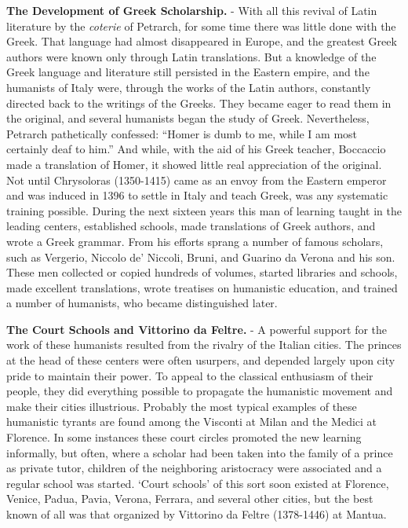 \documentclass[
]{book}
\begin{document}
\textbf{The Development of Greek Scholarship.} - With all this revival of Latin literature by the \emph{coterie} of Petrarch, for some time there was little done with the Greek. That language had almost disappeared in Europe, and the greatest Greek authors were known only through Latin translations. But a knowledge of the Greek language and literature still persisted in the Eastern empire, and the humanists of Italy were, through the works of the Latin authors, constantly directed back to the writings of the Greeks. They became eager to read them in the original, and several humanists began the study of Greek. Nevertheless, Petrarch pathetically confessed: ``Homer is dumb to me, while I am most certainly deaf to him.'' And while, with the aid of his Greek teacher, Boccaccio made a translation of Homer, it showed little real appreciation of the original. Not until Chrysoloras (1350-1415) came as an envoy from the Eastern emperor and was induced in 1396 to settle in Italy and teach Greek, was any systematic training possible. During the next sixteen years this man of learning taught in the leading centers, established schools, made translations of Greek authors, and wrote a Greek grammar. From his efforts sprang a number of famous scholars, such as Vergerio, Niccolo de' Niccoli, Bruni, and Guarino da Verona and his son. These men collected or copied hundreds of volumes, started libraries and schools, made excellent translations, wrote treatises on humanistic education, and trained a number of humanists, who became distinguished later.

\textbf{The Court Schools and Vittorino da Feltre.} - A powerful support for the work of these humanists resulted from the rivalry of the Italian cities. The princes at the head of these centers were often usurpers, and depended largely upon city pride to maintain their power. To appeal to the classical enthusiasm of their people, they did everything possible to propagate the humanistic movement and make their cities illustrious. Probably the most typical examples of these humanistic tyrants are found among the Visconti at Milan and the Medici at Florence. In some instances these court circles promoted the new learning informally, but often, where a scholar had been taken into the family of a prince as private tutor, children of the neighboring aristocracy were associated and a regular school was started. `Court schools' of this sort soon existed at Florence, Venice, Padua, Pavia, Verona, Ferrara, and several other cities, but the best known of all was that organized by Vittorino da Feltre (1378-1446) at Mantua.
\end{document}
